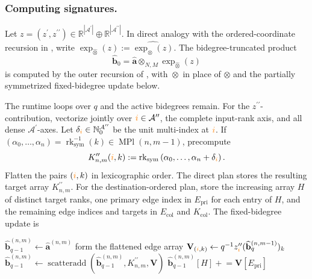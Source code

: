 \documentclass{amsart}
\theoremstyle{definition}
\theoremstyle{remark}
\newcommand{\orange}[1]{{\color{orange}#1}}
\begin{document}
\subsubsection{Computing signatures.}
Let
$z=(z^{\prime},z^{\prime\prime})
\in
\mathbb{R}^{|\mathcal{A}^{\prime}|}
\oplus
\mathbb{R}^{|\mathcal{A}^{\prime\prime}|}$.
In direct analogy with the ordered-coordinate recursion in
, write
$\exp_{\widehat{\otimes}}(z):=\widehat{\exp_{\otimes}(z)}$. The
bidegree-truncated product
\[
    \widehat{\mathbf{b}}_0
    =
    \widehat{\mathbf{a}}
    \widehat{\otimes}_{N,M}
    \exp_{\widehat{\otimes}}(z)
\]
is computed by the outer recursion of
, with $\widehat{\otimes}$ in place of
$\otimes$ and the partially symmetrized fixed-bidegree update below.

\begin{implrmk}
The runtime loops over $q$ and the active bidegrees remain. For the
$z^{\prime\prime}$-contribution, vectorize jointly over
$\orange{i}\in\mathcal{A}^{\prime\prime}$, the complete input-rank axis,
and all dense $\mathcal{A}^{\prime}$-axes. Let
$\delta_{\orange{i}}\in\mathbb{N}_0^{\mathcal{A}^{\prime\prime}}$ be the
unit multi-index at $\orange{i}$. If
$(\alpha_0,\ldots,\alpha_n)
=\operatorname{rk}_{\mathrm{sym}}^{-1}(k)
\in\operatorname{MPl}(n,m-1)$, precompute
\[
    K^{\prime\prime}_{n,m}(\orange{i},k)
    :=
    \operatorname{rk}_{\mathrm{sym}}
    \left(
        \alpha_0,\ldots,
        \alpha_n+\delta_{\orange{i}}
    \right).
\]
Flatten the pairs $(\orange{i},k)$ in lexicographic order. The direct plan
stores the resulting target array $K^{\prime\prime}_{n,m}$. For the
destination-ordered plan, store the increasing array $H$ of distinct target
ranks, one primary edge index in $E_{\mathrm{pri}}$ for each entry of $H$,
and the remaining edge indices and targets in $E_{\mathrm{col}}$ and
$K_{\mathrm{col}}$. The fixed-bidegree update is
\begin{algorithmic}[1]
\State $\widehat{\mathbf{b}}_{q-1}^{(n,m)}
    \gets\widehat{\mathbf{a}}^{(n,m)}$
    \State form the flattened edge array
    $\mathbf{V}_{(\orange{i},k)}
    \gets
    q^{-1}z^{\prime\prime}_{\orange{i}}
    (\widehat{\mathbf{b}}_q^{(n,m-1)})_k$
        \State $\widehat{\mathbf{b}}_{q-1}^{(n,m)}
        \gets
        \operatorname{scatteradd}
        (\widehat{\mathbf{b}}_{q-1}^{(n,m)},
        K^{\prime\prime}_{n,m},\mathbf{V})$
    \Else
        \State $\widehat{\mathbf{b}}_{q-1}^{(n,m)}[H]
        \mathrel{+}=\mathbf{V}[E_{\mathrm{pri}}]$

\end{algorithmic}
\end{implrmk}
\end{document}
